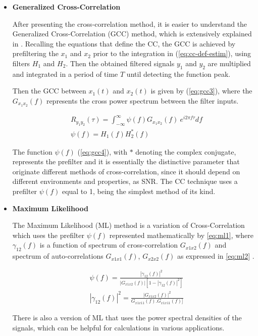 \begin{itemize}
	\item \textbf{Generalized Cross-Correlation}

After presenting the cross-correlation method, it is easier to understand the Generalized Cross-Correlation (GCC) method, which is extensively explained in \cite{eq:cc-def-estim}. Recalling the equations that define the CC, the GCC is achieved by prefiltering the $x_1$ and $x_2$ prior to the integration in (\ref{eq:cc-def-estim}), using filters $H_1$ and $H_2$. Then the obtained filtered signals $y_1$ and $y_2$ are multiplied and integrated in a period of time $T$ until detecting the function peak.

Then the GCC between $x_1(t)$ and $x_2(t)$ is given by (\ref{eq:gcc3}), where the $G_{x_1x_2}(f)$ represents the cross power spectrum between the filter inputs. 

\begin{eqnarray}
	& R_{y_1y_2}(\tau) = \int_{-\infty}^{\infty} \psi(f) G_{x_1x_2}(f)\ e^{i2\pi f\tau} df
	\label{eq:gcc3}\\
	& \psi(f) = H_1(f)H_2^*(f)
	\label{eq:gcc4}	
\end{eqnarray}

The function $\psi(f)$ (\ref{eq:gcc4}), with $*$ denoting the complex conjugate, represents the prefilter and it is essentially the distinctive parameter that originate different methods of cross-correlation, since it should depend on different environments and properties, as SNR. The CC technique uses a prefilter $\psi(f)$ equal to 1, being the simplest method of its kind.

\item \textbf{Maximum Likelihood}

The Maximum Likelihood (ML) method is a variation of Cross-Correlation which uses the prefilter $\psi(f)$ represented mathematically by \ref{eq:ml1}, where $\gamma_{12}(f)$ is a function of spectrum of cross-correlation $G_{x1x2}(f)$ and spectrum of auto-correlations $G_{x1x1}(f)$, $G_{x2x2}(f)$ as expressed in \ref{eq:ml2} \cite{crosscorr}.

\begin{eqnarray}
& \psi(f) = \frac{|\gamma_{12}(f)|^2}{|G_{x1x2}(f)|[1-|\gamma_{12}(f)|^2]}
\label{eq:ml1} \\
& |\gamma_{12}(f)|^2 = \frac{|G_{x1x2}(f)|^2}{G_{x1x11}(f) . G_{x1x11}(f)]}
\label{eq:ml2} 
\end{eqnarray}

There is also a version of ML that uses the power spectral densities of the signals, which can be helpful for calculations in various applications. 
\end{itemize}

